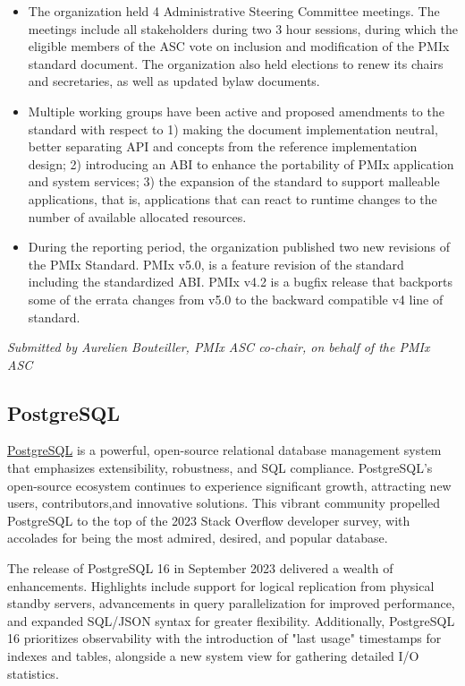 \documentclass[a4paper]{report}
\begin{document}
\begin{itemize}

\item The organization held 4 Administrative Steering Committee meetings. The meetings include all stakeholders during two 3 hour sessions, during which the eligible members of the ASC vote on inclusion and modification of the PMIx standard document. The organization also held elections to renew its chairs and secretaries, as well as updated bylaw documents.

\item Multiple working groups have been active and proposed amendments to the standard with respect to 1) making the document implementation neutral, better separating API and concepts from the reference implementation design; 2) introducing an ABI to enhance the portability of PMIx application and system services; 3) the expansion of the standard to support malleable applications, that is, applications that can react to runtime changes to the number of available allocated resources.

\item During the reporting period, the organization published two new revisions of the PMIx Standard. PMIx v5.0, is a feature revision of the standard including the standardized ABI. PMIx v4.2 is a bugfix release that backports some of the errata changes from v5.0 to the backward compatible v4 line of standard.

\end{itemize}

{\em Submitted by Aurelien Bouteiller, PMIx ASC co-chair, on behalf of the PMIx ASC}

\subsection{PostgreSQL}

\href{https://www.postgresql.org/}{PostgreSQL} is a powerful, open-source relational database management system that emphasizes extensibility, robustness, and SQL compliance.  PostgreSQL's open-source ecosystem continues to experience significant growth, attracting new users, contributors,and innovative solutions.  This vibrant community propelled PostgreSQL to the top of the 2023 Stack Overflow developer survey, with accolades for being the most admired, desired, and popular database.

The release of PostgreSQL 16 in September 2023 delivered a wealth of enhancements. Highlights include support for logical replication from physical standby servers, advancements in query parallelization for improved performance, and expanded SQL/JSON syntax for greater flexibility. Additionally, PostgreSQL 16 prioritizes observability with the introduction of "last usage" timestamps for indexes and tables, alongside a new system view for gathering detailed I/O statistics.
\end{document}
